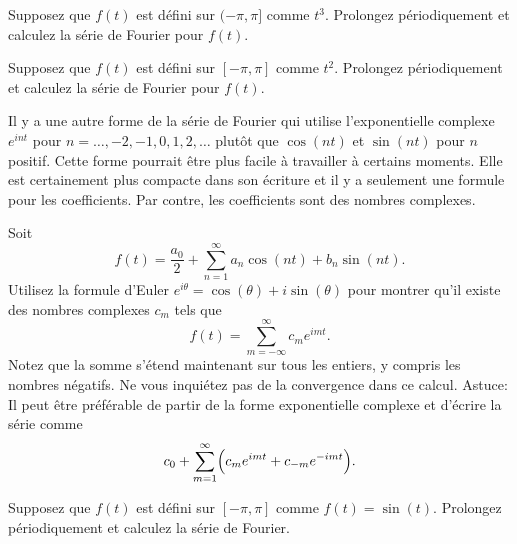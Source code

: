 \begin{exercise}
Supposez que $f(t)$ est défini sur  $(-\pi,\pi]$ comme $t^3$.
Prolongez périodiquement et calculez la série de Fourier pour $f(t)$.
\end{exercise}

\begin{exercise}
Supposez que $f(t)$ est défini sur $[-\pi,\pi]$ comme $t^2$.
Prolongez périodiquement et calculez la série de Fourier pour $f(t)$.
\end{exercise}

Il y a une autre forme de la série de Fourier qui utilise l'exponentielle complexe 
$e^{int}$ pour $n=\ldots,-2,-1,0,1,2,\ldots$ plutôt que
$\cos(nt)$ et $\sin(nt)$ pour $n$ positif.  Cette forme pourrait être plus facile à travailler à certains moments. Elle est certainement plus compacte dans son écriture et il y a seulement une formule pour les coefficients. Par contre, les coefficients sont des nombres complexes. 

\begin{exercise}
\begin{samepage}
Soit 
\begin{equation*}
f(t) = \frac{a_0}{2} + \sum_{n=1}^\infty a_n \cos (n t)
+ b_n \sin (n t) .
\end{equation*}
Utilisez la formule d'Euler $e^{i\theta} = \cos (\theta) + i \sin (\theta)$ pour montrer qu'il existe des nombres complexes 
 $c_m$ tels que
\begin{equation*}
f(t) = 
\sum_{m=-\infty}^\infty c_m e^{imt} .
\end{equation*}
Notez que la somme s'étend maintenant sur tous les entiers, y compris les nombres négatifs.
Ne vous inquiétez pas de la convergence dans ce calcul.
Astuce: Il peut être préférable de partir de la forme exponentielle complexe et d'écrire
la série comme 
\begin{equation*}
c_0 + \sum_{m=1}^\infty \Bigl( c_m e^{imt} + c_{-m} e^{-imt}  \Bigr).
\end{equation*}
\end{samepage}
\end{exercise}

\setcounter{exercise}{100}

\begin{exercise}
Supposez que $f(t)$ est défini sur $[-\pi,\pi]$ comme $f(t) = \sin(t)$. Prolongez périodiquement et calculez la série de Fourier.
\end{exercise}

